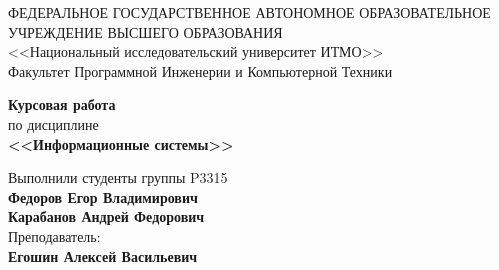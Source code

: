 \begin{titlepage}
  \thispagestyle{firststyle}
  \begin{center}
    ФЕДЕРАЛЬНОЕ ГОСУДАРСТВЕННОЕ АВТОНОМНОЕ ОБРАЗОВАТЕЛЬНОЕ УЧРЕЖДЕНИЕ ВЫСШЕГО ОБРАЗОВАНИЯ\\
    \vspace{0.5cm}
    <<Национальный исследовательский университет ИТМО>>\\
    Факультет Программной Инженерии и Компьютерной Техники \\
    \vspace{1cm}
  \end{center}

  \vspace{1cm}

  \begin{center}
    \large
    \textbf{Курсовая работа}\\
    по дисциплине\\
    \textbf{<<Информационные системы>>} \\
  \end{center}

  \vspace{2cm}

  \begin{flushright}
    Выполнили студенты  группы P3315\\
    \textbf{Федоров Егор Владимирович} \\
    \textbf{Карабанов Андрей Федорович} \\
    Преподаватель: \\
    \textbf{Егошин Алексей Васильевич}\\
  \end{flushright}
\end{titlepage}
